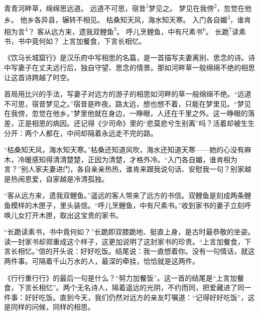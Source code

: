 
\begin{poem}
青青河畔草，绵绵思远道。
远道不可思，宿昔\textsuperscript{1}梦见之。
梦见在我傍\textsuperscript{2}，忽觉在他乡。
他乡各异县，辗转不相见。
枯桑知天风，海水知天寒。
入门各自媚\textsuperscript{3}，谁肯相为言\textsuperscript{4}？
客从远方来，遗我双鲤鱼\textsuperscript{5}。
呼儿烹鲤鱼，中有尺素书\textsuperscript{6}。
长跪\textsuperscript{7}读素书，书中竟何如？
上言加餐食，下言长相忆。
\end{poem}

\begin{annotations}
\end{annotations}

\begin{appreciation}
《饮马长城窟行》是汉乐府中写相思的名篇，是一首描写夫妻离别、思念的诗。诗中写妻子在丈夫远行后，独自守望、思念的情景。那如河畔草一般绵绵不绝的相思让这首诗跨越了时空。

首局用比兴的手法，写妻子对远方的游子的相思如河畔的草一般绵绵不绝。“远道不可思，宿昔梦见之。”宿昔是昨夜。路太远，想也想不着，只能在梦里见。“梦见在我傍，忽觉在他乡。”梦里他就在身边，一睁眼，人还在千里之外。这一睁眼的落差，正是相思的病因。还记得《少司命》里的“悲莫悲兮生别离”吗？活着却被生生分开：两个人都在，中间却隔着永远走不完的路。

“枯桑知天风，海水知天寒。”枯桑还知道风吹，海水还知道天寒——她的心没有麻木，冷暖感知得清清楚楚，正因为清楚，才格外冷。“入门各自媚，谁肯相为言？”别人家夫妻进门，各自亲亲热热，谁肯来跟我说句话、安慰我一句？别家越是热闹恩爱，自家越是冷清孤独。

“客从远方来，遗我双鲤鱼。”遥远的客人带来了远方的书信。双鲤鱼是刻成两条鲤鱼模样的木匣子，里头装信。“呼儿烹鲤鱼，中有尺素书。”收到家书的妻子立刻呼唤儿女打开木匣，取出这宝贵的家书。

“长跪读素书，书中竟何如？”长跪即双膝跪地、挺直上身，是古时最恭敬的坐姿。读一封家书却郑重成这个样子，这更加说明了这封家书的珍贵。“上言加餐食，下言长相忆。”信的开头说：好好吃饭。结尾说：我一直想着你。没有一句情话，就这两件事。可隔着千山万水的人，最深的牵挂，恰恰就是这两件。

《行行重行行》的最后一句是什么？“努力加餐饭”。这一首的结尾是“上言加餐食，下言长相忆”。两个无名诗人，隔着遥远的光阴，不约而同，把爱藏进了同一件事：好好吃饭。直到今天，我们仍然对远方的亲友叮嘱道：“记得好好吃饭”，这是同样的问候，同样的相思。
\end{appreciation}
